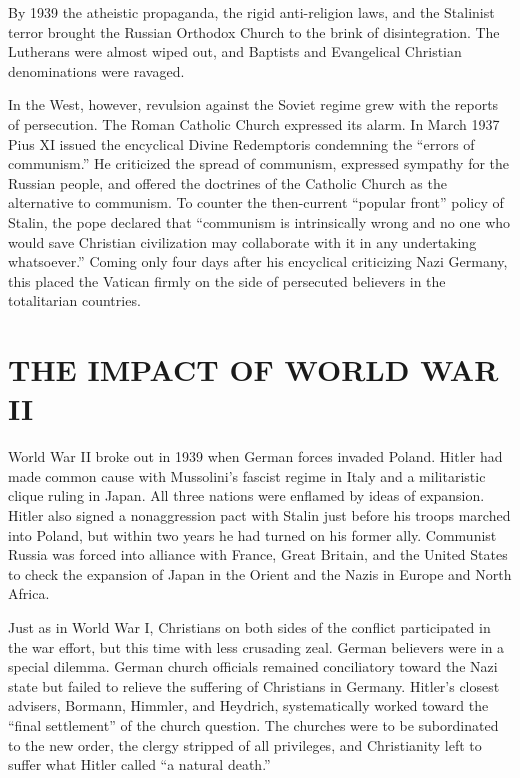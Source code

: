 By 1939 the atheistic propaganda, the rigid anti-religion laws, and the Stalinist terror brought the
Russian Orthodox Church to the brink of disintegration. The Lutherans were almost wiped out, and
Baptists and Evangelical Christian denominations were ravaged.

In the West, however, revulsion against the Soviet regime grew with the reports of persecution. The
Roman Catholic Church expressed its alarm. In March 1937 Pius XI issued the encyclical Divine
Redemptoris condemning the “errors of communism.” He criticized the spread of communism, expressed
sympathy for the Russian people, and offered the doctrines of the Catholic Church as the alternative
to communism. To counter the then-current “popular front” policy of Stalin, the pope declared that
“communism is intrinsically wrong and no one who would save Christian civilization may collaborate
with it in any undertaking whatsoever.” Coming only four days after his encyclical criticizing Nazi
Germany, this placed the Vatican firmly on the side of persecuted believers in the totalitarian
countries.

\section{THE IMPACT OF WORLD WAR II}

World War II broke out in 1939 when German forces invaded Poland. Hitler had made common cause with
Mussolini’s fascist regime in Italy and a militaristic clique ruling in Japan. All three nations
were enflamed by ideas of expansion. Hitler also signed a nonaggression pact with Stalin just before
his troops marched into Poland, but within two years he had turned on his former ally. Communist
Russia was forced into alliance with France, Great Britain, and the United States to check the
expansion of Japan in the Orient and the Nazis in Europe and North Africa.

Just as in World War I, Christians on both sides of the conflict participated in the war effort, but
this time with less crusading zeal. German believers were in a special dilemma. German church
officials remained conciliatory toward the Nazi state but failed to relieve the suffering of
Christians in Germany. Hitler’s closest advisers, Bormann, Himmler, and Heydrich, systematically
worked toward the “final settlement” of the church question. The churches were to be subordinated to
the new order, the clergy stripped of all privileges, and Christianity left to suffer what Hitler
called “a natural death.”

